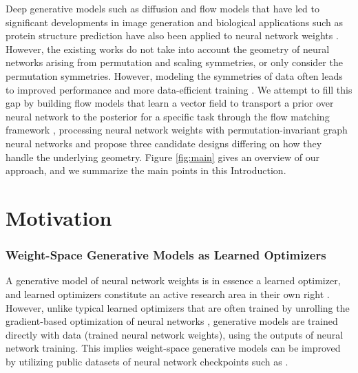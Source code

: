 Deep generative models such as diffusion and flow models that have led to significant developments in image generation \citep{esserScalingRectifiedFlow2024b} and biological applications such as protein structure prediction \citep{abramsonAccurateStructurePrediction2024} have also been applied to neural network weights \citep{peeblesLearningLearnGenerative2022,schurholtHyperRepresentationsLearningPopulations2024a}. However, the existing works do not take into account the geometry of neural networks arising from permutation and scaling symmetries, or only consider the permutation symmetries. However, modeling the symmetries of data often leads to improved performance and more data-efficient training \citep{brehmerDoesEquivarianceMatter2024}. We attempt to fill this gap by building flow models that learn a vector field to transport a prior over neural network to the posterior for a specific task through the flow matching framework \citep{lipmanFlowMatchingGuide2024}, processing neural network weights with permutation-invariant graph neural networks \citep{kofinasGraphNeuralNetworks2024,limGraphMetanetworksProcessing2023} and propose three candidate designs differing on how they handle the underlying geometry. Figure \ref{fig:main} gives an overview of our approach, and we summarize the main points in this Introduction. 

\section{Motivation}

\subsubsection*{Weight-Space Generative Models as Learned Optimizers}

A generative model of neural network weights is in essence a learned optimizer, and learned optimizers constitute an active research area in their own right \citep{hospedalesMetaLearningNeuralNetworks2022}. However, unlike typical learned optimizers that are often trained by unrolling the gradient-based optimization of neural networks \citep{finnModelAgnosticMetaLearningFast2017}, generative models are trained directly with data (trained neural network weights), using the outputs of neural network training. This implies weight-space generative models can be improved by utilizing public datasets of neural network checkpoints such as \citep{peeblesLearningLearnGenerative2022,schurholtModelZoosDataset2022}.

